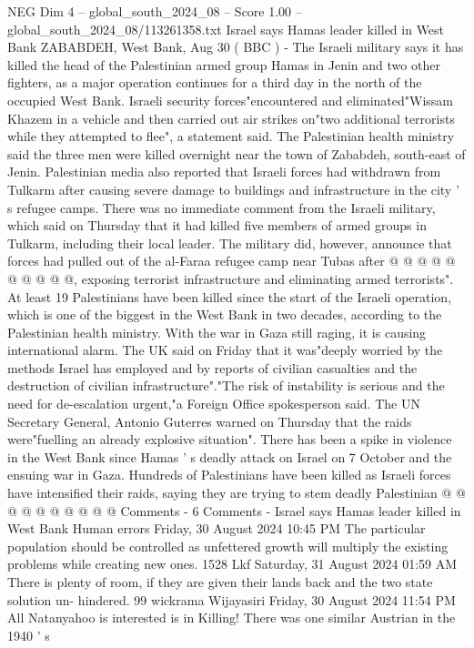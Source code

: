 \begin{textsample}{NEG Dim 4 – global\_south\_2024\_08 – Score 1.00 – global\_south\_2024\_08/113261358.txt}  \label{ex:f4_neg_337}
Israel says Hamas leader killed in West Bank ZABABDEH, West Bank, Aug 30 ( BBC ) - The Israeli military says it has killed the head of the Palestinian armed group Hamas in Jenin and two other fighters, as a major operation continues for a third day in the north of the occupied West Bank.
Israeli security forces"encountered and eliminated"Wissam Khazem in a vehicle and then carried out air strikes on"two additional terrorists while they attempted to flee", a statement said.
The Palestinian health ministry said the three men were killed overnight near the town of Zababdeh, south-east of Jenin.
Palestinian media also reported that Israeli forces had withdrawn from Tulkarm after causing severe damage to buildings and infrastructure in the city ' s refugee camps.
There was no immediate comment from the Israeli military, which said on Thursday that it had killed five members of armed groups in Tulkarm, including their local leader.
The military did, however, announce that forces had pulled out of the al-Faraa refugee camp near Tubas after @ @ @ @ @ @ @ @ @ @, exposing terrorist infrastructure and eliminating armed terrorists".
At least 19 Palestinians have been killed since the start of the Israeli operation, which is one of the biggest in the West Bank in two decades, according to the Palestinian health ministry.
With the war in Gaza still raging, it is causing international alarm.
The UK said on Friday that it was"deeply worried by the methods Israel has employed and by reports of civilian casualties and the destruction of civilian infrastructure"."The risk of instability is serious and the need for de-escalation urgent,"a Foreign Office spokesperson said.
The UN Secretary General, Antonio Guterres warned on Thursday that the raids were"fuelling an already explosive situation".
There has been a spike in violence in the West Bank since Hamas ' s deadly attack on Israel on 7 October and the ensuing war in Gaza.
Hundreds of Palestinians have been killed as Israeli forces have intensified their raids, saying they are trying to stem deadly Palestinian @ @ @ @ @ @ @ @ @ @ Comments - 6 Comments - Israel says Hamas leader killed in West Bank Human errors Friday, 30 August 2024 10:45 PM The particular population should be controlled as unfettered growth will multiply the existing problems while creating new ones. 1528 Lkf Saturday, 31 August 2024 01:59 AM There is plenty of room, if they are given their lands back and the two state solution un- hindered. 99 wickrama Wijayasiri Friday, 30 August 2024 11:54 PM All Natanyahoo is interested is in Killing!
There was one similar Austrian in the 1940 ' s

\end{textsample}
